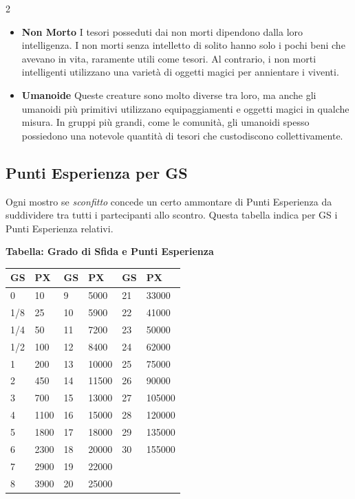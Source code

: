 \begin{multicols}{2}
\begin{itemize}[leftmargin=*]
	\item \textbf{Non Morto}
	I tesori posseduti dai non morti dipendono dalla loro intelligenza. I non morti senza intelletto di solito hanno solo i pochi beni che avevano in vita, raramente utili come tesori. Al contrario, i non morti intelligenti utilizzano una varietà di oggetti magici per annientare i viventi.

	\item \textbf{Umanoide}
	Queste creature sono molto diverse tra loro, ma anche gli umanoidi più primitivi utilizzano equipaggiamenti e oggetti magici in qualche misura. In gruppi più grandi, come le comunità, gli umanoidi spesso possiedono una notevole quantità di tesori che custodiscono collettivamente.

\end{itemize}


\subsection{Punti Esperienza per GS}

Ogni mostro se \emph{sconfitto} concede un certo ammontare di Punti Esperienza da suddividere tra tutti i partecipanti allo scontro. Questa tabella indica per GS i Punti Esperienza relativi.

\textbf{Tabella: Grado di Sfida e Punti Esperienza}

\medskip

\noindent\begin{tabularx}{\linewidth}{Xl|Xl|Xl}
	\toprule
	\rowcolor{gray!20}\textbf{GS} & \textbf{PX} &\textbf{GS} & \textbf{PX} &\textbf{GS} & \textbf{PX}\\
	\toprule
	0& 10 &9& 5000& 21&33000\\
	\rowcolor{gray!20}1/8& 25 &10& 5900&22&41000\\
	1/4& 50 &11& 7200&23&50000\\
	\rowcolor{gray!20}1/2& 100 &12& 8400&24&62000\\
	1& 200 &13& 10000&25&75000\\
	\rowcolor{gray!20}2& 450&14& 11500&26&90000\\
	3& 700&15& 13000&27&105000\\
	\rowcolor{gray!20}4& 1100&16& 15000&28&120000\\
	5& 1800&17& 18000&29&135000\\
	\rowcolor{gray!20}6& 2300&18& 20000&30&155000\\
	7& 2900&19& 22000&&\\
	\rowcolor{gray!20}8& 3900&20& 25000&&
\end{tabularx}


\end{multicols}
